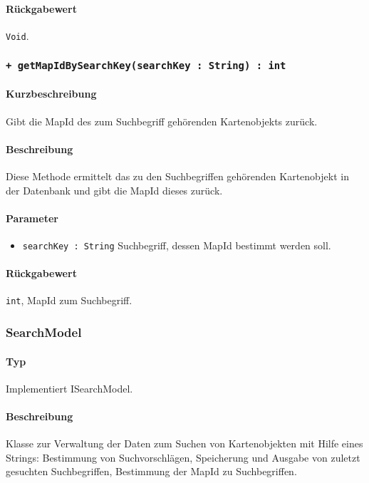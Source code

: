 \paragraph*{Rückgabewert}
\texttt{Void}.

 \subsubsection*{\texttt{+ getMapIdBySearchKey(searchKey : String) : int}}%
\paragraph*{Kurzbeschreibung}
Gibt die MapId des zum Suchbegriff gehörenden Kartenobjekts zurück.
\paragraph*{Beschreibung}
Diese Methode ermittelt das zu den Suchbegriffen gehörenden Kartenobjekt in der Datenbank und gibt die MapId dieses zurück.
\paragraph*{Parameter}
\begin{itemize}
    \item \texttt{searchKey : String} Suchbegriff, dessen MapId bestimmt werden soll.
\end{itemize}
\paragraph*{Rückgabewert}
\texttt{int}, MapId zum Suchbegriff.


\subsubsection{SearchModel}
\paragraph*{Typ}
Implementiert ISearchModel.
\paragraph*{Beschreibung}
Klasse zur Verwaltung der Daten zum Suchen von Kartenobjekten mit Hilfe eines Strings: 
Bestimmung von Suchvorschlägen, Speicherung und Ausgabe von zuletzt gesuchten Suchbegriffen, Bestimmung der MapId zu Suchbegriffen.